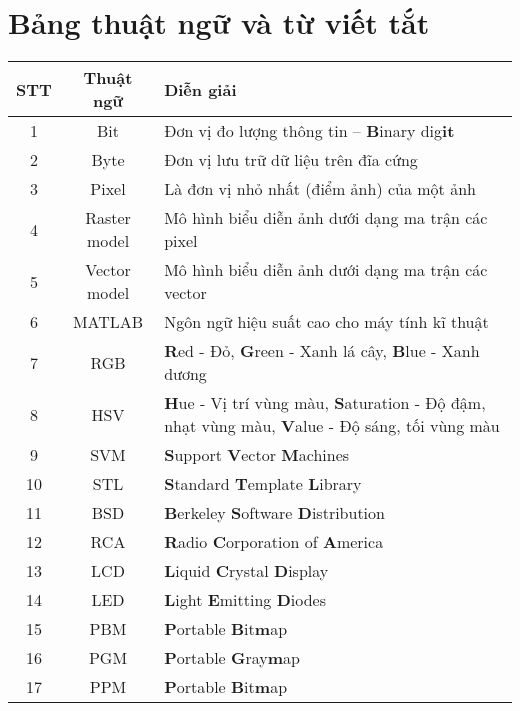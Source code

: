 \chapter*{\Huge Bảng thuật ngữ và từ viết tắt}

\renewcommand{\arraystretch}{1} %
\begin{tabular}{|c|c|p{10cm}|}
    \hline \textbf{STT} & \textbf{Thuật ngữ} & \textbf{Diễn giải}\\ [0.5ex] \hline \hline 
    1 & Bit & Đơn vị đo lượng thông tin – \textbf{B}inary dig\textbf{it}\\ \hline 
    2 & Byte & Đơn vị lưu trữ dữ liệu trên đĩa cứng\\ \hline 
    3 & Pixel & Là đơn vị nhỏ nhất (điểm ảnh) của một ảnh\\ \hline
    4 & Raster model & Mô hình biểu diễn ảnh dưới dạng ma trận các pixel\\ \hline
    5 & Vector model & Mô hình biểu diễn ảnh dưới dạng ma trận các vector\\ \hline
    6 & MATLAB & Ngôn ngữ hiệu suất cao cho máy tính kĩ thuật\\ \hline
    7 & RGB & \textbf{R}ed - Đỏ, \textbf{G}reen - Xanh lá cây, \textbf{B}lue - Xanh dương\\ \hline
    8 & HSV & \textbf{H}ue - Vị trí vùng màu, \textbf{S}aturation - Độ đậm, nhạt vùng màu, \textbf{V}alue - Độ sáng, tối vùng màu \\ \hline
    9 & SVM & \textbf{S}upport \textbf{V}ector \textbf{M}achines \\ \hline
    10 & STL & \textbf{S}tandard \textbf{T}emplate \textbf{L}ibrary\\ \hline
    11 & BSD & \textbf{B}erkeley \textbf{S}oftware \textbf{D}istribution\\ \hline
    12 & RCA & \textbf{R}adio \textbf{C}orporation of \textbf{A}merica\\ \hline
    13 & LCD & \textbf{L}iquid \textbf{C}rystal \textbf{D}isplay\\ \hline
    14 & LED & \textbf{L}ight \textbf{E}mitting \textbf{D}iodes\\ \hline
    15 & PBM & \textbf{P}ortable \textbf{B}it\textbf{m}ap\\ \hline
    16 & PGM & \textbf{P}ortable \textbf{G}ray\textbf{m}ap\\ \hline
    17 & PPM & \textbf{P}ortable \textbf{B}it\textbf{m}ap \\ \hline
\end{tabular}